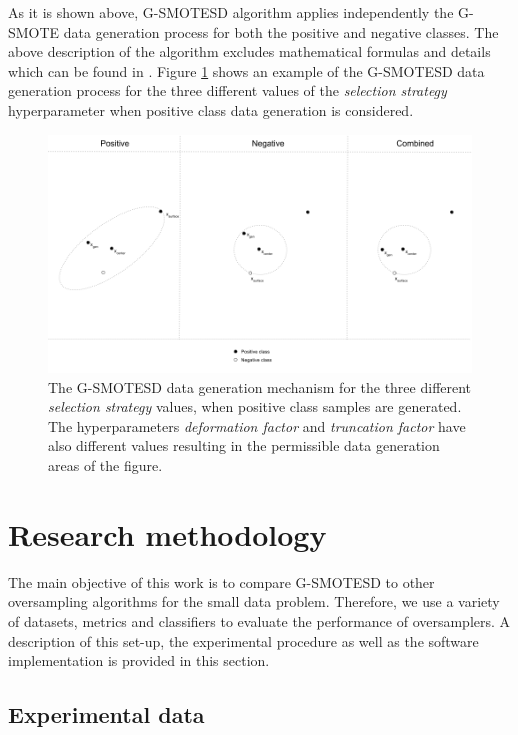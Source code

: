 \documentclass[parskip=full]{scrartcl}
\begin{document}
As it is shown above, G-SMOTESD algorithm applies independently the G-SMOTE data generation process for both the positive and negative classes. The above description of the algorithm excludes mathematical formulas and details which
can be found in \cite{Douzas.2019}. Figure \ref{fig:gsmotemechanism} shows an
example of the G-SMOTESD data generation process for the three different
values of the \textit{selection strategy} hyperparameter when positive class
data generation is considered.

\begin{figure}[H]
	\centering
	\includegraphics[width=1\linewidth]{../analysis/gsmote_mechanism.png}
	\caption{The G-SMOTESD data generation mechanism for the three  different \textit{selection strategy} values, when positive class samples are generated. The hyperparameters \textit{deformation factor} and \textit{truncation factor} have also different values resulting in the permissible data generation areas of the figure.}
	\label{fig:gsmotemechanism}
\end{figure}

\section{Research methodology}
\label{research}

The main objective of this work is to compare G-SMOTESD to other oversampling
algorithms for the small data problem. Therefore, we use a variety of datasets, metrics and classifiers to evaluate the performance of oversamplers. A description of this set-up, the experimental procedure as well as the software implementation is provided in this section.

\subsection{Experimental data}
\end{document}

